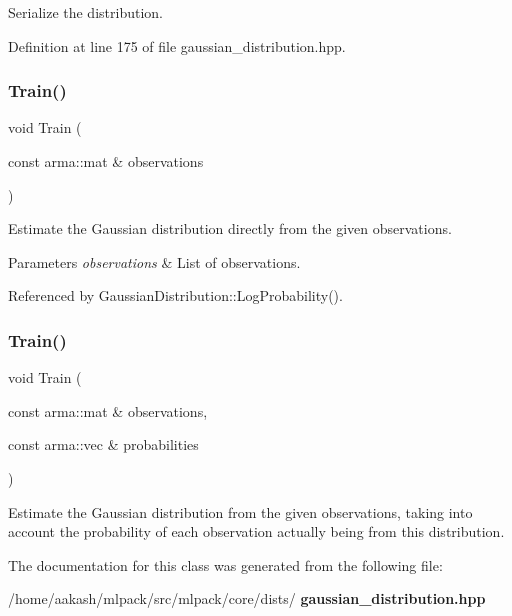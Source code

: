 Serialize the distribution. 



Definition at line 175 of file gaussian\+\_\+distribution.\+hpp.

\mbox{\label{classmlpack_1_1distribution_1_1GaussianDistribution_a269c6f8a40ce41a5f7b6d035aef58238}} 
\subsubsection{Train()\hspace{0.1cm}{\footnotesize\ttfamily [1/2]}}
{\footnotesize\ttfamily void Train (\begin{DoxyParamCaption}\item[{const arma\+::mat \&}]{observations }\end{DoxyParamCaption})}



Estimate the Gaussian distribution directly from the given observations. 


\begin{DoxyParams}{Parameters}
{\em observations} & List of observations. \\
\hline
\end{DoxyParams}


Referenced by Gaussian\+Distribution\+::\+Log\+Probability().

\mbox{\label{classmlpack_1_1distribution_1_1GaussianDistribution_ad71152f8853ac60c92a165ed72384125}} 
\subsubsection{Train()\hspace{0.1cm}{\footnotesize\ttfamily [2/2]}}
{\footnotesize\ttfamily void Train (\begin{DoxyParamCaption}\item[{const arma\+::mat \&}]{observations,  }\item[{const arma\+::vec \&}]{probabilities }\end{DoxyParamCaption})}



Estimate the Gaussian distribution from the given observations, taking into account the probability of each observation actually being from this distribution. 



The documentation for this class was generated from the following file\+:\begin{DoxyCompactItemize}
\item 
/home/aakash/mlpack/src/mlpack/core/dists/\textbf{ gaussian\+\_\+distribution.\+hpp}\end{DoxyCompactItemize}
